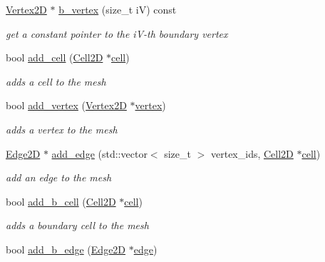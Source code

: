 \begin{DoxyCompactItemize}
\hyperlink{classHArDCore2D_1_1Vertex2D}{Vertex2D} $\ast$ \hyperlink{classHArDCore2D_1_1Mesh2D_a843c1fa9dcbff99667a03d3f4d45bcb9}{b\+\_\+vertex} (size\+\_\+t iV) const
\begin{DoxyCompactList}\small\item\em get a constant pointer to the i\+V-\/th boundary vertex \end{DoxyCompactList}\item 
bool \hyperlink{group__Mesh2D_gac5e6d42c9fa1f3d0a55be60e119f5278}{add\+\_\+cell} (\hyperlink{classHArDCore2D_1_1Cell2D}{Cell2D} $\ast$\hyperlink{classHArDCore2D_1_1Mesh2D_a1d8c40ea85f0abe3ae5aea23e4a95583}{cell})
\begin{DoxyCompactList}\small\item\em adds a cell to the mesh \end{DoxyCompactList}\item 
bool \hyperlink{group__Mesh2D_gab7fe3d51faf7828161648636ddaebfa1}{add\+\_\+vertex} (\hyperlink{classHArDCore2D_1_1Vertex2D}{Vertex2D} $\ast$\hyperlink{classHArDCore2D_1_1Mesh2D_ac29a7c5c0c36b3aa519520fbb9cf20de}{vertex})
\begin{DoxyCompactList}\small\item\em adds a vertex to the mesh \end{DoxyCompactList}\item 
\mbox{\label{classHArDCore2D_1_1Mesh2D_af9587d7b5a27cc83df1c51d5eaa43aaf}} 
\hyperlink{classHArDCore2D_1_1Edge2D}{Edge2D} $\ast$ \hyperlink{classHArDCore2D_1_1Mesh2D_af9587d7b5a27cc83df1c51d5eaa43aaf}{add\+\_\+edge} (std\+::vector$<$ size\+\_\+t $>$ vertex\+\_\+ids, \hyperlink{classHArDCore2D_1_1Cell2D}{Cell2D} $\ast$\hyperlink{classHArDCore2D_1_1Mesh2D_a1d8c40ea85f0abe3ae5aea23e4a95583}{cell})
\begin{DoxyCompactList}\small\item\em add an edge to the mesh \end{DoxyCompactList}\item 
bool \hyperlink{group__Mesh2D_ga4e3e091b5164de9e3bb189c699810d3d}{add\+\_\+b\+\_\+cell} (\hyperlink{classHArDCore2D_1_1Cell2D}{Cell2D} $\ast$\hyperlink{classHArDCore2D_1_1Mesh2D_a1d8c40ea85f0abe3ae5aea23e4a95583}{cell})
\begin{DoxyCompactList}\small\item\em adds a boundary cell to the mesh \end{DoxyCompactList}\item 
bool \hyperlink{group__Mesh2D_ga4b7d71e891c3141a4dea979c8dda2a99}{add\+\_\+b\+\_\+edge} (\hyperlink{classHArDCore2D_1_1Edge2D}{Edge2D} $\ast$\hyperlink{classHArDCore2D_1_1Mesh2D_a9dd54d7b118e6f645d9af819a7555e93}{edge})

\end{DoxyCompactItemize}
